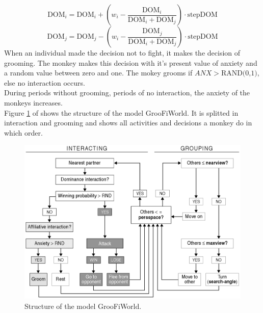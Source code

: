 \documentclass[11pt]{article}
\begin{document}
\begin{equation}
\label{eq:DomUpdate1}
\text{DOM}_i =\text{DOM}_i +(w_i -\frac{\text{DOM}_i}{\text{DOM}_i +\text{DOM}_j})\cdot\text{stepDOM}
\end{equation}
\begin{equation}
\label{eq:DomUpdate2}
\text{DOM}_j =\text{DOM}_j -(w_i -\frac{\text{DOM}_j}{\text{DOM}_i +\text{DOM}_j})\cdot\text{stepDOM}
\end{equation}
When an individual made the decision not to fight, it makes the decision of grooming. The monkey makes this decision with it's present value of anxiety and a random value between zero and one. The mokey grooms if $ANX > \text{RAND(0,1)}$, else no interaction occurs.\\
During periods without grooming, periods of no interaction, the anxiety of the monkeys increases.\cite{Puga-Gonzalez2009}\\

Figure \ref{fig:GrooFiWorld} of \cite{Puga-Gonzalez2009} shows the structure of the model GrooFiWorld. It is splitted in interaction and grooming and shows all activities and decisions a monkey do in which order.

\begin{figure}[H]
\centering
\includegraphics[scale=0.35]{Photos/Structure}
\caption[Structure of the model GrooFiWorld]{Structure of the model GrooFiWorld.\cite{Puga-Gonzalez2009}}
\label{fig:GrooFiWorld}
\end{figure}
\end{document}
